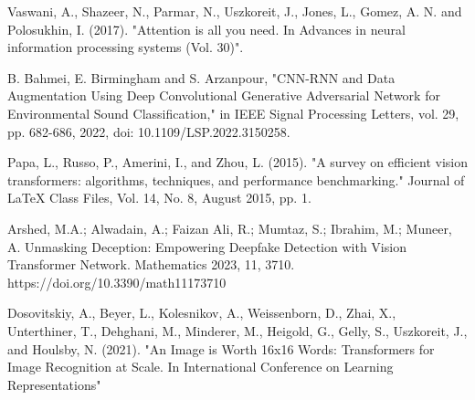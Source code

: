 \begin{thebibliography}{99}
    \item\label{ref9} Vaswani, A., Shazeer, N., Parmar, N., Uszkoreit, J., Jones, L., Gomez, A. N. and Polosukhin, I. (2017). "Attention is all you need. In Advances in neural information processing systems (Vol. 30)".

    \item\label{ref10} B. Bahmei, E. Birmingham and S. Arzanpour, "CNN-RNN and Data Augmentation Using Deep Convolutional Generative Adversarial Network for Environmental Sound Classification," in IEEE Signal Processing Letters, vol. 29, pp. 682-686, 2022, doi: 10.1109/LSP.2022.3150258.

    \item\label{ref11} Papa, L., Russo, P., Amerini, I., and Zhou, L. (2015). "A survey on efficient vision transformers: algorithms, techniques, and performance benchmarking." Journal of LaTeX Class Files, Vol. 14, No. 8, August 2015, pp. 1.
    
    \item\label{ref12} Arshed, M.A.; Alwadain, A.; Faizan Ali, R.; Mumtaz, S.; Ibrahim, M.; Muneer, A. Unmasking Deception: Empowering Deepfake Detection with Vision Transformer Network. Mathematics 2023, 11, 3710. https://doi.org/10.3390/math11173710
    \item\label{ref13} Dosovitskiy, A., Beyer, L., Kolesnikov, A., Weissenborn, D., Zhai, X., Unterthiner, T., Dehghani, M., Minderer, M., Heigold, G., Gelly, S., Uszkoreit, J., and Houlsby, N. (2021). "An Image is Worth 16x16 Words: Transformers for Image Recognition at Scale. In International Conference on Learning Representations"
\end{thebibliography}